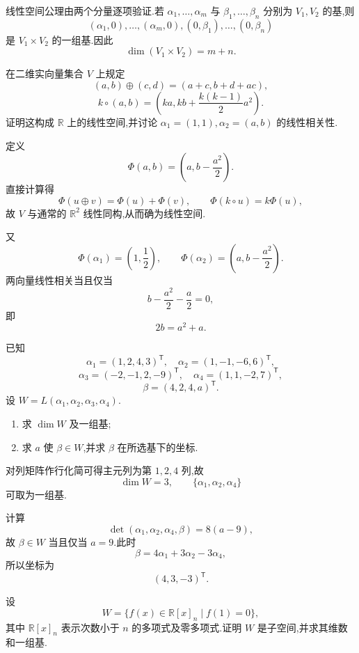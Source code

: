 \begin{solution}
线性空间公理由两个分量逐项验证.若 $\alpha_1,\ldots,\alpha_m$ 与 $\beta_1,\ldots,\beta_n$ 分别为 $V_1,V_2$ 的基,则
\[
 (\alpha_1,0),\ldots,(\alpha_m,0),(0,\beta_1),\ldots,(0,\beta_n)
\]
是 $V_1\times V_2$ 的一组基.因此
\[
 \boxed{\dim(V_1\times V_2)=m+n}.
\]
\end{solution}

\begin{example}
在二维实向量集合 $V$ 上规定
\[
(a,b)\oplus(c,d)=(a+c,b+d+ac),
\]
\[
k\circ(a,b)=\left(ka,kb+\dfrac{k(k-1)}{2}a^2\right).
\]
证明这构成 $\mathbb{R}$ 上的线性空间,并讨论 $\alpha_1=(1,1),\alpha_2=(a,b)$ 的线性相关性.
\end{example}
\exampleblank

\begin{solution}
定义
\[
 \Phi(a,b)=\left(a,b-\dfrac{a^2}{2}\right).
\]
直接计算得
\[
 \Phi(u\oplus v)=\Phi(u)+\Phi(v),
 \qquad
 \Phi(k\circ u)=k\Phi(u),
\]
故 $V$ 与通常的 $\mathbb{R}^2$ 线性同构,从而确为线性空间.

又
\[
 \Phi(\alpha_1)=\left(1,\dfrac12\right),
 \qquad
 \Phi(\alpha_2)=\left(a,b-\dfrac{a^2}{2}\right).
\]
两向量线性相关当且仅当
\[
 b-\dfrac{a^2}{2}-\dfrac a2=0,
\]
即
\[
 \boxed{2b=a^2+a}.
\]
\end{solution}

\begin{example}
已知
\[
\alpha_1=(1,2,4,3)^{\mathsf T},\quad
\alpha_2=(1,-1,-6,6)^{\mathsf T},
\]
\[
\alpha_3=(-2,-1,2,-9)^{\mathsf T},\quad
\alpha_4=(1,1,-2,7)^{\mathsf T},
\]
\[
\beta=(4,2,4,a)^{\mathsf T}.
\]
设 $W=L(\alpha_1,\alpha_2,\alpha_3,\alpha_4)$.
\begin{enumerate}
\item 求 $\dim W$ 及一组基;
\item 求 $a$ 使 $\beta\in W$,并求 $\beta$ 在所选基下的坐标.
\end{enumerate}
\end{example}
\exampleblank

\begin{solution}
对列矩阵作行化简可得主元列为第 $1,2,4$ 列,故
\[
 \dim W=3,
 \qquad
 \{\alpha_1,\alpha_2,\alpha_4\}
\]
可取为一组基.

计算
\[
 \det(\alpha_1,\alpha_2,\alpha_4,\beta)=8(a-9),
\]
故 $\beta\in W$ 当且仅当 $a=9$.此时
\[
 \beta=4\alpha_1+3\alpha_2-3\alpha_4,
\]
所以坐标为
\[
 \boxed{(4,3,-3)^{\mathsf T}}.
\]
\end{solution}

\begin{example}
设
\[
W=\{f(x)\in\mathbb{R}[x]_n\mid f(1)=0\},
\]
其中 $\mathbb{R}[x]_n$ 表示次数小于 $n$ 的多项式及零多项式.证明 $W$ 是子空间,并求其维数和一组基.
\end{example}
\exampleblank

